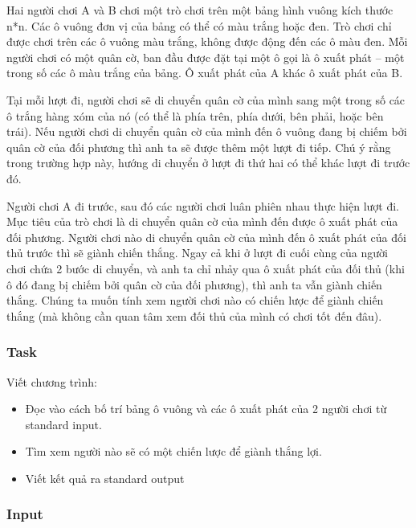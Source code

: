 



   Hai người chơi A và B chơi một trò chơi trên một bảng hình vuông kích thước n*n. Các ô vuông đơn vị của bảng có thể có màu trắng hoặc đen. Trò chơi chỉ được chơi trên các ô vuông màu trắng, không được động đến các ô màu đen. Mỗi người chơi có một quân cờ, ban đầu được đặt tại một ô gọi là ô xuất phát – một trong số các ô màu trắng của bảng. Ô xuất phát của A khác ô xuất phát của B.  

   Tại mỗi lượt đi, người chơi sẽ di chuyển quân cờ của mình sang một trong số các ô trắng hàng xóm của nó (có thể là phía trên, phía dưới, bên phải, hoặc bên trái). Nếu người chơi di chuyển quân cờ của mình đến ô vuông đang bị chiếm bởi quân cờ của đối phương thì anh ta sẽ được thêm một lượt đi tiếp. Chú ý rằng trong trường hợp này, hướng di chuyển ở lượt đi thứ hai có thể khác lượt đi trước đó.  

   Người chơi A đi trước, sau đó các người chơi luân phiên nhau thực hiện lượt đi. Mục tiêu của trò chơi là di chuyển quân cờ của mình đến được ô xuất phát của đối phương. Người chơi nào di chuyển quân cờ của mình đến ô xuất phát của đối thủ trước thì sẽ giành chiến thắng. Ngay cả khi ở lượt đi cuối cùng của người chơi chứa 2 bước di chuyển, và anh ta chỉ nhảy qua ô xuất phát của đối thủ (khi ô đó đang bị chiếm bởi quân cờ của đối phương), thì anh ta vẫn giành chiến thắng. Chúng ta muốn tính xem người chơi nào có chiến lược để giành chiến thắng (mà không cần quan tâm xem đối thủ của mình có chơi tốt đến đâu).  

\subsubsection{   Task  }

   Viết chương trình:  
\begin{itemize}
	\item     Đọc vào cách bố trí bảng ô vuông và các ô xuất phát của 2 người chơi từ standard input.   
	\item     Tìm xem người nào sẽ có một chiến lược để giành thắng lợi.   
	\item     Viết kết quả ra standard output   
\end{itemize}



\subsubsection{   Input  }

